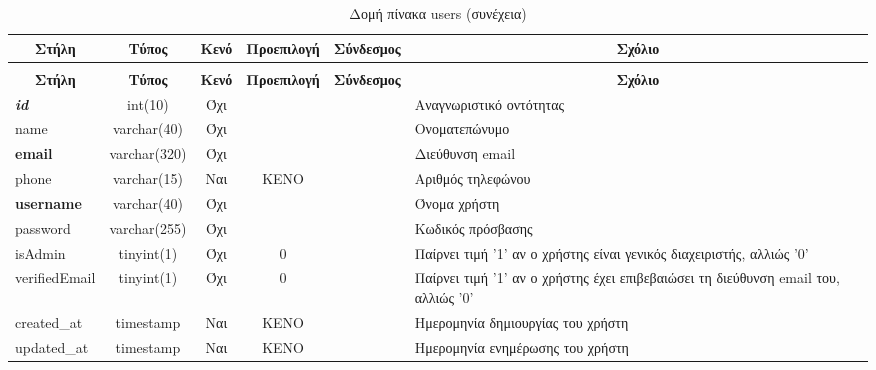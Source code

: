 %
%
\begin{longtable}{|l|c|c|c|l|p{4.5cm}|}
	\caption{Δομή πίνακα users} \label{tab:users-structure} \\
	\hline \multicolumn{1}{|c|}{\textbf{Στήλη}} & \multicolumn{1}{|c|}{\textbf{Τύπος}} & \multicolumn{1}{|c|}{\textbf{Κενό}} & \multicolumn{1}{|c|}{\textbf{Προεπιλογή}} & \multicolumn{1}{|c|}{\textbf{Σύνδεσμος}} & \multicolumn{1}{|c|}{\textbf{Σχόλιο}} \\ \hline \hline \endfirsthead
	\caption[{}]{Δομή πίνακα users (συνέχεια)} \\
	\hline \multicolumn{1}{|c|}{\textbf{Στήλη}} & \multicolumn{1}{|c|}{\textbf{Τύπος}} & \multicolumn{1}{|c|}{\textbf{Κενό}} & \multicolumn{1}{|c|}{\textbf{Προεπιλογή}} & \multicolumn{1}{|c|}{\textbf{Σύνδεσμος}} & \multicolumn{1}{|c|}{\textbf{Σχόλιο}} \\ \hline \hline \endhead \endfoot
	\textbf{\textit{id}} & int(10) & Όχι &  &  & Αναγνωριστικό οντότητας \\ \hline
	name & varchar(40) & Όχι &  &  & Ονοματεπώνυμο \\ \hline
	\textbf{email} & varchar(320) & Όχι &  &  & Διεύθυνση email\\ \hline
	phone & varchar(15) & Ναι & ΚΕΝΟ &  & Αριθμός τηλεφώνου \\ \hline
	\textbf{username} & varchar(40) & Όχι &  &  & Όνομα χρήστη \\ \hline
	password & varchar(255) & Όχι &  &  & Κωδικός πρόσβασης \\ \hline
	isAdmin & tinyint(1) & Όχι & 0 &  & Παίρνει τιμή '1' αν ο χρήστης είναι γενικός διαχειριστής, αλλιώς '0' \\ \hline
	verifiedEmail & tinyint(1) & Όχι & 0 &  & Παίρνει τιμή '1' αν ο χρήστης έχει επιβεβαιώσει τη διεύθυνση email του, αλλιώς '0' \\ \hline
	created\_at & timestamp & Ναι & ΚΕΝΟ &  & Ημερομηνία δημιουργίας του χρήστη \\ \hline
	updated\_at & timestamp & Ναι & ΚΕΝΟ &  & Ημερομηνία ενημέρωσης του χρήστη \\ \hline
\end{longtable}

